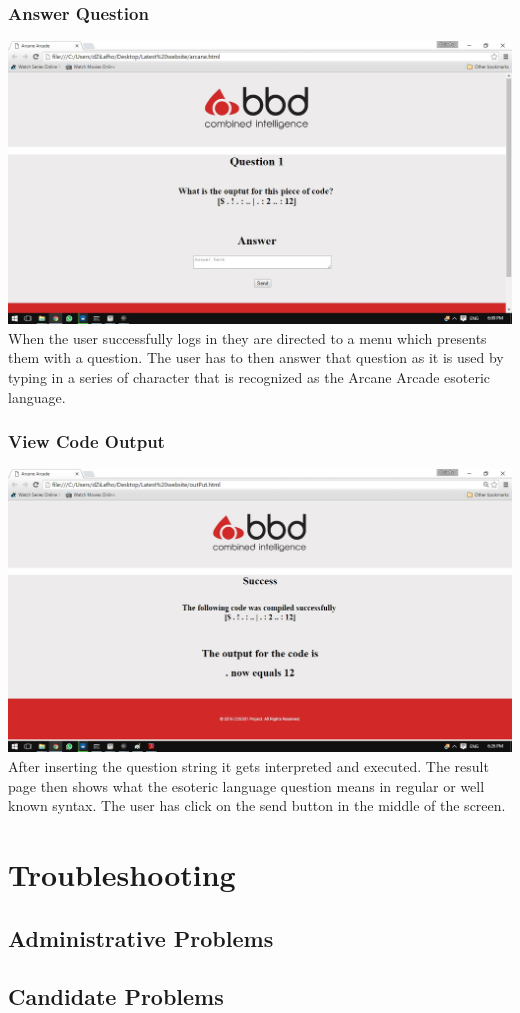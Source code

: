 \documentclass[english]{article}
\begin{document}
\newpage			
			\subsubsection{Answer Question}
				\includegraphics[width=\linewidth]{question.jpg}
				When the user successfully logs in they are directed to a menu which presents them with a question. The user has to then answer that question as it is used by typing in a series of character that is recognized as the Arcane Arcade esoteric language.
			\subsubsection{View Code Output}
				\includegraphics[width=\linewidth]{outResults.jpg}
				After inserting the question string it gets interpreted and executed. The result page then shows what the esoteric language question means in regular or well known syntax. The user has click on the send button in the middle of the screen.
		
	\section{Troubleshooting}
		\subsection{Administrative Problems}
		\subsection{Candidate Problems}
		
\end{document}
